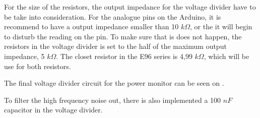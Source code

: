 For the size of the resistors, the output impedance for the voltage divider have to be take into consideration. For the analogue pins on the Arduino, it is recommend to have a output impedance smaller than 10 $k\Omega$, or the it will begin to disturb the reading on the pin.
To make sure that is does not happen, the resistors in the voltage divider is set to the half of the maximum output impedance, 5 $k\Omega$. The closet resistor in the E96 series is 4,99 $k\Omega$, which will be use for both resistors. 

The final voltage divider circuit for the power monitor can be seen on \figref{}.


To filter the high frequency noise out, there is also implemented a 100 $nF$ capacitor in the voltage divider.


